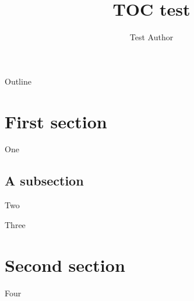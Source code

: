 \documentclass[aspectratio=169,10pt]{beamer}
\title{TOC test}
\author{Test Author}
\begin{document}
\maketitle
\begin{frame}[toc]{Outline}
	\tableofcontents
\end{frame}
\section{First section}
\begin{frame}{One}\end{frame}
\subsection{A subsection}
\begin{frame}{Two}\end{frame}
\begin{frame}{Three}\end{frame}
\section{Second section}
\begin{frame}{Four}\end{frame}
\end{document}
